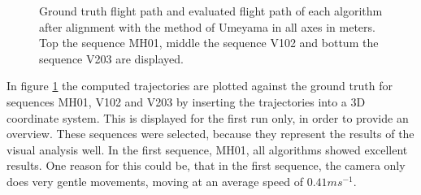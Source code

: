 	\begin{figure}%
    \centering
    \qquad
	\qquad
    \caption{
	Ground truth flight path and evaluated flight path of each algorithm after alignment with the method of Umeyama in all axes in meters. 
	Top the sequence MH01, middle the sequence V102 and bottum the sequence V203 are displayed.
	}%
    \label{fig:flight_path}%
	\end{figure}
	
	In figure \ref{fig:flight_path} the computed trajectories are plotted against the ground truth for sequences MH01, V102 and V203 by inserting the 
	trajectories into a 3D coordinate system. This is displayed for the first run only, in order to provide an overview. These sequences 
	were selected, because they represent the results of the visual analysis well. In the first sequence, MH01, all algorithms showed excellent results. 
	One reason for this could be, that in the first sequence, the camera only does very gentle movements, moving at an average speed of $0.41 ms^{-1}$. 
	
